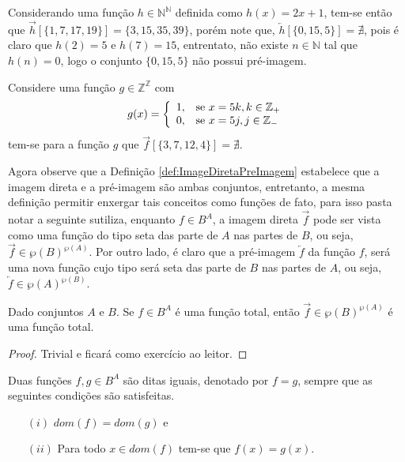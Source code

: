 \begin{exemplo}\label{exe:ImagemDiretaPreImagem3}
  Considerando uma função $h \in \mathbb{N}^\mathbb{N}$ definida como $h(x)= 2x + 1$, tem-se então que $\overrightarrow{h}[\{1, 7, 17, 19\}] = \{3, 15, 35, 39\}$, porém note que,  $\overleftarrow{h}[\{0, 15, 5\}] = \nexists$, pois é claro que $h(2) = 5$ e $h(7) = 15$, entrentato, não existe $n \in \mathbb{N}$ tal que $h(n) = 0$, logo o conjunto $\{0, 15, 5\}$ não possui pré-imagem.
\end{exemplo}

\begin{exemplo}\label{exe:ImagemDiretaPreImagem4}
  Considere uma função $g \in \mathbb{Z}^\mathbb{Z}$ com 
  $$g(x) = \left\{\begin{array}{ll}	1, & \hbox{se } x = 5k, k \in \mathbb{Z}_+\\0,  & \hbox{se } x = 5j, j \in \mathbb{Z}_{-} \end{array}\right.$$
  tem-se para a função $g$ que $\overrightarrow{f}[\{3, 7, 12, 4\}] = \nexists$.
\end{exemplo}

Agora observe que a Definição \ref{def:ImageDiretaPreImagem} estabelece que a imagem direta e a pré-imagem são ambas conjuntos, entretanto, a mesma definição permitir enxergar tais conceitos como funções de fato, para isso pasta notar a seguinte sutiliza, enquanto $f \in B^A$, a imagem direta $\overrightarrow{f}$ pode ser vista como uma função do tipo seta das parte de $A$ nas partes de $B$, ou seja, $\overrightarrow{f} \in \wp(B)^{\wp(A)}$. Por outro lado, é claro que a pré-imagem $\overleftarrow{f}$ da função $f$, será uma nova função cujo tipo será seta das parte de $B$ nas partes de $A$, ou seja, $\overleftarrow{f} \in \wp(A)^{\wp(B)}$.

\begin{proposicao}
	Dado conjuntos $A$ e $B$. Se $f \in B^A$ é uma função total, então $\overrightarrow{f} \in \wp(B)^{\wp(A)}$ é uma função total.
\end{proposicao}

\begin{proof}
	Trivial e ficará como exercício ao leitor.
\end{proof}

\begin{definicao}\label{def:IgualdadeFuncao}
	Duas funções $f, g \in B^A$ são ditas iguais, denotado por $f = g$, sempre que as seguintes condições são satisfeitas.
	\begin{itemize}
		\item[$(i)$] $dom(f) = dom(g)$ e 
		\item[$(ii)$] Para todo $x \in dom(f)$ tem-se que $f(x) = g(x)$.
	\end{itemize}
\end{definicao}

